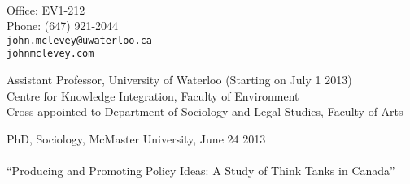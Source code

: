 \documentclass[11pt,usenames,dvipsnames]{article}
\makeatletter
\def\myemail{john.mclevey@uwaterloo.ca}
\def\myphone{(647) 921-2044}
\def\lastupdated{Last Updated: June 25, 2013}
\makeatother
\begin{document}
\begin{minipage}[t]{2.95in}
 \\
  \end{minipage}
\hfill     
\hfill
\begin{minipage}[t]{1.7in}
  \flushright \footnotesize Office: EV1-212 \\ Phone: \myphone \\ 
  {\scriptsize  \texttt{\href{mailto:\myemail}{\myemail}}} \\
  {\scriptsize  \texttt{\href{http://www.johnmclevey.com}{johnmclevey.com}}}\\
\end{minipage}


\bigskip

\reversemarginpar

\medskip 

{}

\noindent Assistant Professor, University of Waterloo (Starting on July 1 2013) \\
\noindent Centre for Knowledge Integration, Faculty of Environment \\
\noindent Cross-appointed to Department of Sociology and Legal Studies, Faculty of Arts \\

\medskip 
{}

\noindent PhD, Sociology, McMaster University, June 24 2013\\ 

\\ 
``Producing and Promoting Policy Ideas: A Study of Think Tanks in Canada''\\
\end{document}
